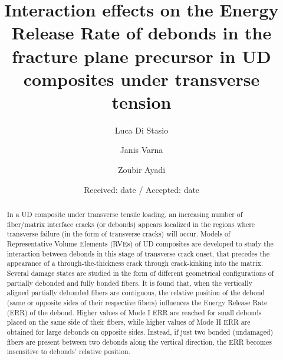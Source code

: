 \documentclass[smallextended]{svjour3}       %
\begin{document}
\title{Interaction effects on the Energy Release Rate of debonds in the fracture plane precursor in UD composites under transverse tension}


\author{Luca Di Stasio   \and
        Janis Varna \and
        Zoubir Ayadi
}



\date{Received: date / Accepted: date}


\maketitle

\begin{abstract}
In a UD composite under transverse tensile loading, an increasing number of fiber/matrix interface cracks (or debonds) appears localized in the regions where transverse failure (in the form of transverse cracks) will occur. Models of Representative Volume Elements (RVEs) of UD composites are developed to study the interaction between debonds in this stage of transverse crack onset, that precedes the appearance of a through-the-thickness crack through crack-kinking into the matrix. Several damage states are studied in the form of different geometrical configurations of partially debonded and fully bonded fibers. It is found that, when the vertically aligned partially debonded fibers are contiguous, the relative position of the debond (same or opposite sides of their respective fibers) influences the Energy Release Rate (ERR) of the debond. Higher values of Mode I ERR are reached for small debonds placed on the same side of their fibers, while higher values of Mode II ERR are obtained for large debonds on opposite sides. Instead, if just two bonded (undamaged) fibers are present between two debonds along the vertical direction, the ERR becomes insensitive to debonds' relative position.
\end{abstract}
\end{document}
